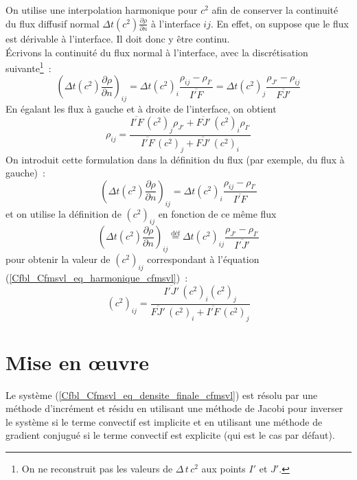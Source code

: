 On utilise une interpolation harmonique pour $c^2$
afin de conserver la continuité du flux diffusif normal
$\Delta t (c^2) \displaystyle\frac{\partial \rho}{\partial n}$
à l'interface $ij$. En effet, on suppose que le flux est dérivable à
l'interface. Il doit donc y être continu.\\
%
Écrivons la continuité du flux normal à l'interface,
avec la discrétisation
suivante\footnote{On ne reconstruit pas les valeurs de $\Delta\,t\,c^2$
aux points $I'$ et
$J'$.}~:
\begin{equation}
\left(\Delta t (c^2)\displaystyle\frac{\partial \rho}{\partial n}\right)_{ij}
= \Delta t (c^2)_i  \displaystyle\frac{\rho_{ij} - \rho_{I'}   }{\overline{I'F}}
=  \Delta t (c^2)_j  \displaystyle\frac{\rho_{J'}    - \rho_{ij}}{\overline{FJ'}}
\end{equation}
En égalant les flux à gauche et à droite de l'interface, on obtient
\begin{equation}
\rho_{ij} = \displaystyle\frac{\overline{I'F}\,(c^2)_j\rho_{J'} + \overline{FJ'}\,(c^2)_i\rho_{I'}}
{\overline{I'F}\,(c^2)_j + \overline{FJ'}\,(c^2)_i}
\end{equation}
On introduit cette formulation dans la définition du flux (par exemple, du
flux à gauche)~:
\begin{equation}
\left(\Delta t (c^2)\displaystyle\frac{\partial \rho}{\partial n}\right)_{ij}
= \Delta t (c^2)_i  \displaystyle\frac{\rho_{ij} - \rho_{I'}   }{\overline{I'F}}
\end{equation}
et on utilise la définition de $(c^2)_{ij}$ en fonction de ce même flux
\begin{equation}
\left(\Delta t (c^2)\displaystyle\frac{\partial \rho}{\partial n}\right)_{ij}
 \stackrel{\text{déf}}{=}
 \Delta t (c^2)_{ij} \displaystyle\frac{\rho_{J'}    - \rho_{I'}   }{\overline{I'J'}}
\end{equation}
pour obtenir la valeur de $(c^2)_{ij}$ correspondant à l'équation (\ref{Cfbl_Cfmsvl_eq_harmonique_cfmsvl})~:
\begin{equation}
(c^2)_{ij} = \displaystyle\frac{\overline{I'J'}\,(c^2)_i(c^2)_j}{\overline{FJ'}\,(c^2)_i + \overline{I'F}\,(c^2)_j}
\end{equation}

\section*{Mise en \oe uvre}
Le système (\ref{Cfbl_Cfmsvl_eq_densite_finale_cfmsvl}) est résolu par une méthode
d'incrément et résidu en utilisant
une méthode de Jacobi pour inverser le système si le terme convectif
est implicite et en utilisant une méthode de gradient conjugué
si le terme convectif est explicite (qui est le cas par défaut).

